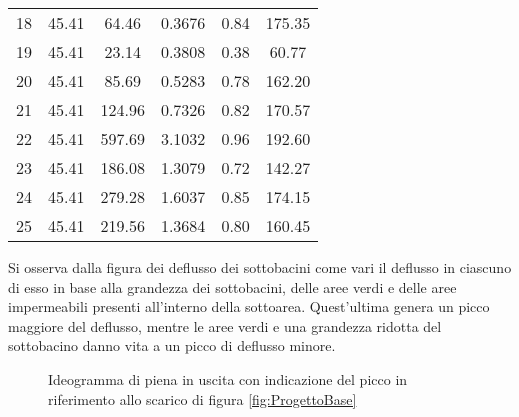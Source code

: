 \begin{table}[htbp]
\begin{tabular}{cS[table-format=2.2]S[table-format=3.2]S[table-format=1.4]S[table-format=1.2]S[table-format=3.2]}
18 & 45.41 & 64.46 & 0.3676 & 0.84 & 175.35 \\
19 & 45.41 & 23.14 & 0.3808 & 0.38 & 60.77 \\
20 & 45.41 & 85.69 & 0.5283 & 0.78 & 162.20 \\
21 & 45.41 & 124.96 & 0.7326 & 0.82 & 170.57 \\
22 & 45.41 & 597.69 & 3.1032 & 0.96 & 192.60 \\
23 & 45.41 & 186.08 & 1.3079 & 0.72 & 142.27 \\
24 & 45.41 & 279.28 & 1.6037 & 0.85 & 174.15 \\
25 & 45.41 & 219.56 & 1.3684 & 0.80 & 160.45 \\ \bottomrule
\end{tabular}
\end{table}

{}

Si osserva dalla figura {} dei deflusso dei sottobacini come vari il deflusso in ciascuno di esso in base alla grandezza dei sottobacini, delle aree verdi e delle aree impermeabili presenti all'interno della sottoarea. 
Quest'ultima genera un picco maggiore del deflusso, mentre le aree verdi e una grandezza ridotta del sottobacino danno vita a un picco di deflusso minore.
 





\begin{figure}[htbp]
    \centering
    \caption{Ideogramma di piena in uscita con indicazione del picco in riferimento allo scarico di figura \ref{fig:ProgettoBase}}
    \label{fig:IdeogrammaPiena}
\end{figure}   



